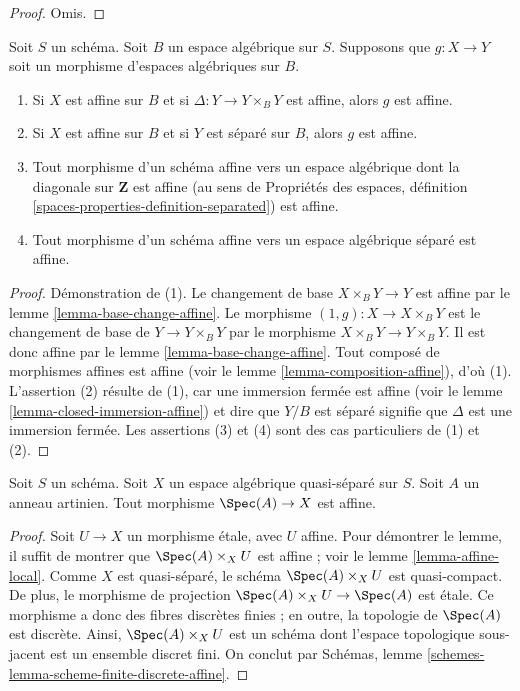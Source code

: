 \begin{proof}
Omis.
\end{proof}

\begin{lemma}
\label{lemma-affine-permanence}
Soit $S$ un schéma. Soit $B$ un espace algébrique sur $S$.
Supposons que $g : X \to Y$ soit un morphisme d'espaces algébriques sur $B$.
\begin{enumerate}
\item Si $X$ est affine sur $B$ et si $\Delta : Y \to Y \times_B Y$ est affine,
alors $g$ est affine.
\item Si $X$ est affine sur $B$ et si $Y$ est séparé sur $B$,
alors $g$ est affine.
\item Tout morphisme d'un schéma affine vers un espace algébrique dont la
diagonale sur $\mathbf{Z}$ est affine (au sens de Propriétés des espaces, définition
\ref{spaces-properties-definition-separated}) est affine.
\item Tout morphisme d'un schéma affine vers un espace algébrique séparé
est affine.
\end{enumerate}
\end{lemma}

\begin{proof}
Démonstration de (1). Le changement de base $X \times_B Y \to Y$ est affine par le
lemme \ref{lemma-base-change-affine}.
Le morphisme $(1, g) : X \to X \times_B Y$ est le changement de base de
$Y \to Y \times_B Y$ par le morphisme $X \times_B Y \to Y \times_B Y$.
Il est donc affine par le
lemme \ref{lemma-base-change-affine}.
Tout composé de morphismes affines est affine
(voir le lemme \ref{lemma-composition-affine}), d'où (1).
L'assertion (2) résulte de (1), car une immersion fermée est affine
(voir le lemme \ref{lemma-closed-immersion-affine}) et dire que $Y/B$ est séparé
signifie que $\Delta$ est une immersion fermée. Les assertions (3) et (4) sont des cas
particuliers de (1) et (2).
\end{proof}

\begin{lemma}
\label{lemma-Artinian-affine}
Soit $S$ un schéma. Soit $X$ un espace algébrique quasi-séparé sur $S$.
Soit $A$ un anneau artinien. Tout morphisme $\Spec(A) \to X$ est affine.
\end{lemma}

\begin{proof}
Soit $U \to X$ un morphisme étale, avec $U$ affine. Pour démontrer le
lemme, il suffit de montrer que $\Spec(A) \times_X U$ est affine ; voir le
lemme \ref{lemma-affine-local}. Comme $X$ est quasi-séparé, le
schéma $\Spec(A) \times_X U$ est quasi-compact. De plus, le
morphisme de projection $\Spec(A) \times_X U \to \Spec(A)$ est étale.
Ce morphisme a donc des fibres discrètes finies ; en outre,
la topologie de $\Spec(A)$ est discrète. Ainsi, $\Spec(A) \times_X U$
est un schéma dont l'espace topologique
sous-jacent est un ensemble discret fini. On conclut par
Schémas, lemme \ref{schemes-lemma-scheme-finite-discrete-affine}.
\end{proof}












